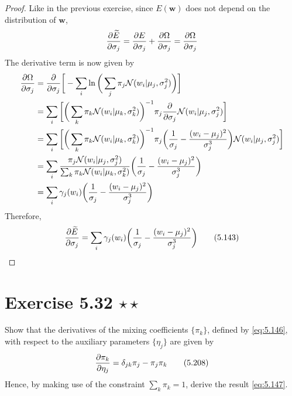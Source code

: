 \begin{proof}
\vspace{1em}
    Like in the previous exercise, since $E(\mathbf{w})$ does not depend on the distribution of $\mathbf{w}$,
    \[
            \pdv{\widetilde{E}}{\sigma_j} 
            = \pdv{E}{\sigma_j} + \pdv{\Omega}{\sigma_j}
            = \pdv{\Omega}{\sigma_j}
    \] 
    The derivative term is now given by
    \begin{align*}
        \pdv{\Omega}{\sigma_j} 
        &= \pdv{\sigma_j} \bigg[-\sum_{i}^{} \ln\bigg(\sum_{j}^{} \pi_j \mathcal{N}(w_i | \mu_j, \sigma_j^2)\bigg)\bigg] \\
        &= \sum_{i}^{} \bigg[\bigg(\sum_{k}^{} \pi_k \mathcal{N}(w_i | \mu_k, \sigma_k^2)\bigg)^{-1}
        \pi_j \pdv{\sigma_j} \mathcal{N}(w_i | \mu_j, \sigma_j^2)\bigg] \\
        &= \sum_{i}^{} \bigg[\bigg(\sum_{k}^{} \pi_k \mathcal{N}(w_i | \mu_k, \sigma_k^2)\bigg)^{-1}
            \pi_j \bigg(\frac{1}{\sigma_j} - \frac{(w_i - \mu_j)^2}{\sigma_j^3}\bigg) 
        \mathcal{N}(w_i | \mu_j, \sigma_j^2)\bigg] \\
        &= \sum_{i}^{} \frac{\pi_j \mathcal{N}(w_i | \mu_j, \sigma_j^2)} 
            {\sum_{k}^{} \pi_k \mathcal{N}(w_i | \mu_k, \sigma_k^2)}
            \bigg(\frac{1}{\sigma_j} - \frac{(w_i - \mu_j)^2}{\sigma_j^3}\bigg) \\
        &= \sum_{i}^{} \gamma_j(w_i)
            \bigg(\frac{1}{\sigma_j} - \frac{(w_i - \mu_j)^2}{\sigma_j^3}\bigg) 
    \end{align*}
    Therefore,
    \begin{equation*}
        \pdv{\widetilde{E}}{\sigma_j}
        = \sum_{i}^{} \gamma_j(w_i)
            \bigg(\frac{1}{\sigma_j} - \frac{(w_i - \mu_j)^2}{\sigma_j^3}\bigg) 
        \tag{5.143}\label{eq:5.143}
    \end{equation*}
\end{proof}

\section*{Exercise 5.32 $\star \star$}
Show that the derivatives of the mixing coefficients $\{\pi_k\}$, defined
by \eqref{eq:5.146}, with respect to the auxiliary parameters $\{\eta_j\}$ are 
given by  
\begin{equation*}
    \pdv{\pi_k}{\eta_j} = \delta_{jk} \pi_j - \pi_j \pi_k
    \tag{5.208}\label{eq:5.208}
\end{equation*}
Hence, by making use of the constraint $\sum_{k}^{} \pi_k = 1$, derive
the result \eqref{eq:5.147}.

